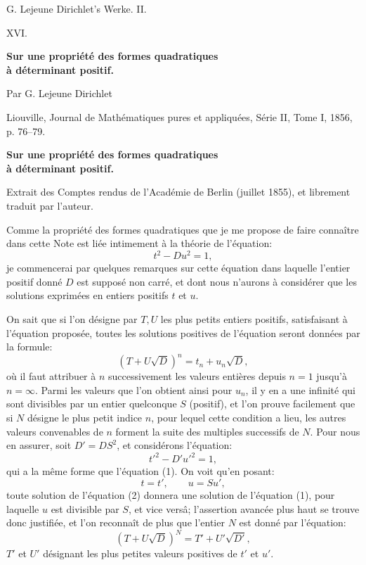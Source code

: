 \documentclass[11pt]{article}
\begin{document}
\begin{center}
{\Large G. Lejeune Dirichlet's Werke. II.}\par\vspace{1.2em}
{\Large XVI.}\par\vspace{0.5em}
{\LARGE \textbf{Sur une propriété des formes quadratiques\\ à déterminant positif.}}\par\vspace{1em}
{\large Par G. Lejeune Dirichlet}\par\vspace{0.5em}
{\small Liouville, Journal de Mathématiques pures et appliquées, Série II, Tome I, 1856, p. 76--79.}
\end{center}

\begin{center}
{\large \textbf{Sur une propriété des formes quadratiques\\ à déterminant positif.}}\par
{\small Extrait des Comptes rendus de l'Académie de Berlin (juillet 1855), et librement traduit par l'auteur.}
\end{center}

Comme la propriété des formes quadratiques que je me propose de faire connaître dans cette Note est liée intimement à la théorie de l'équation:
\[
\tag{1} t^2-Du^2=1,
\]
je commencerai par quelques remarques sur cette équation dans laquelle l'entier positif donné \(D\) est supposé non carré, et dont nous n'aurons à considérer que les solutions exprimées en entiers positifs \(t\) et \(u\).

On sait que si l'on désigne par \(T,U\) les plus petits entiers positifs, satisfaisant à l'équation proposée, toutes les solutions positives de l'équation seront données par la formule:
\[
(T+U\sqrt D)^n=t_n+u_n\sqrt D,
\]
où il faut attribuer à \(n\) successivement les valeurs entières depuis \(n=1\) jusqu'à \(n=\infty\). Parmi les valeurs que l'on obtient ainsi pour \(u_n\), il y en a une infinité qui sont divisibles par un entier quelconque \(S\) (positif), et l'on prouve facilement que si \(N\) désigne le plus petit indice \(n\), pour lequel cette condition a lieu, les autres valeurs convenables de \(n\) forment la suite des multiples successifs de \(N\). Pour nous en assurer, soit \(D'=DS^2\), et considérons l'équation:
\[
\tag{2} t'^2-D'u'^2=1,
\]
qui a la même forme que l'équation (1). On voit qu'en posant:
\[
t=t',\qquad u=Su',
\]
toute solution de l'équation (2) donnera une solution de l'équation (1), pour laquelle \(u\) est divisible par \(S\), et vice versâ; l'assertion avancée plus haut se trouve donc justifiée, et l'on reconnaît de plus que l'entier \(N\) est donné par l'équation:
\[
(T+U\sqrt D)^N=T'+U'\sqrt{D'},
\]
\(T'\) et \(U'\) désignant les plus petites valeurs positives de \(t'\) et \(u'\).
\end{document}
